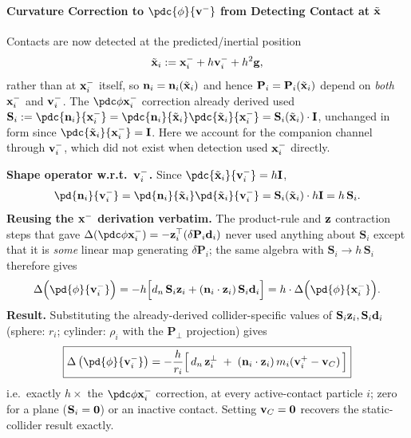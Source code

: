 \begin{derivation}
\paragraph{Curvature Correction to $\pdc{\phi}{\vv^-}$ from Detecting Contact at $\tilde{\mathbf{x}}$} \mbox{}\par\medskip

\begin{reminder}
Contacts are now detected at the predicted/inertial position
$$
\tilde{\mathbf{x}}_i := \mathbf{x}_i^- + h\mathbf{v}_i^- + h^2\mathbf{g},
$$
rather than at $\mathbf{x}_i^-$ itself, so $\mathbf{n}_i=\mathbf{n}_i(\tilde{\mathbf{x}}_i)$ and hence $\mathbf P_i=\mathbf P_i(\tilde{\mathbf{x}}_i)$
depend on \emph{both} $\mathbf{x}_i^-$ and $\mathbf{v}_i^-$. The $\pdc\phi{\x_i^-}$ correction already derived
used $\mathbf S_i:=\pdc{\n_i}{\x_i^-}=\pdc{\n_i}{\tilde\x_i}\pdc{\tilde\x_i}{\x_i^-}=\mathbf S_i(\tilde\x_i)\cdot\I$,
unchanged in form since $\pdc{\tilde\x_i}{\x_i^-}=\I$. Here we account for the companion channel
through $\mathbf{v}_i^-$, which did not exist when detection used $\mathbf{x}_i^-$ directly.
\end{reminder}
\textbf{Shape operator w.r.t.\ $\mathbf{v}_i^-$.} Since $\pdc{\tilde\x_i}{\vv_i^-}=h\I$,
$$
\pd{\n_i}{\vv_i^-} = \pd{\n_i}{\tilde\x_i}\pd{\tilde\x_i}{\vv_i^-} = \mathbf S_i(\tilde\x_i)\cdot h\I = h\,\mathbf S_i.
$$
\newline\textbf{Reusing the $\mathbf{x}^-$ derivation verbatim.} The product-rule and $\mathbf{z}$ contraction steps that gave
$\Delta(\pdc\phi{\x_i^-})=-\z_i^\top(\delta\mathbf P_i\dd_i)$ never used anything about $\mathbf S_i$ except
that it is \emph{some} linear map generating $\delta\mathbf P_i$; the same algebra with $\mathbf S_i\to h\,\mathbf S_i$
therefore gives
$$
\Delta\Big(\pd{\phi}{\vv_i^-}\Big) = -h\Big[d_n\,\mathbf S_i\z_i+(\n_i\cdot\z_i)\,\mathbf S_i\dd_i\Big]
= h\cdot\Delta\Big(\pd{\phi}{\x_i^-}\Big).
$$
\newline \textbf{Result.} Substituting the already-derived collider-specific values of $\mathbf S_i\mathbf{z}_i,\mathbf S_i\mathbf{d}_i$
(sphere: $r_i$; cylinder: $\rho_i$ with the $\mathbf P_\perp$ projection) gives
\begin{equation}
    \boxed{
    \Delta\left(\pd{\phi}{\vv_i^-}\right) = -\frac{h}{r_i}\Big[\,d_n\,\z_i^\perp \;+\; (\n_i\cdot\z_i)\,m_i(\vv_i^+-\vv_C)\,\Big]
    }
\end{equation}
i.e.\ exactly $h\times$ the $\pdc\phi{\x_i^-}$ correction, at every active-contact particle $i$;
zero for a plane ($\mathbf S_i=\mathbf{0}$) or an inactive contact. Setting $\mathbf{v}_C=\mathbf{0}$ recovers the
static-collider result exactly.
\end{derivation}

